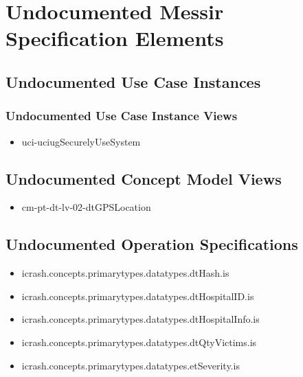 	
\chapter{Undocumented Messir Specification Elements}





\section[Undocumented Use Case Instances]{Undocumented Use Case Instances}




\subsection[Undocumented Use Case Instance Views]{Undocumented Use Case Instance Views}
\begin{itemize}
\item uci-uciugSecurelyUseSystem 
\end{itemize}
















\section[Undocumented Concept Model Views]{Undocumented Concept Model Views}
\begin{itemize}
\item cm-pt-dt-lv-02-dtGPSLocation 
\end{itemize}


\section[Undocumented Operation Specifications]{Undocumented Operation Specifications}
\begin{itemize}
\item icrash.concepts.primarytypes.datatypes.dtHash.is 
\item icrash.concepts.primarytypes.datatypes.dtHospitalID.is 
\item icrash.concepts.primarytypes.datatypes.dtHospitalInfo.is 
\item icrash.concepts.primarytypes.datatypes.dtQtyVictims.is 
\item icrash.concepts.primarytypes.datatypes.etSeverity.is 
\end{itemize}






